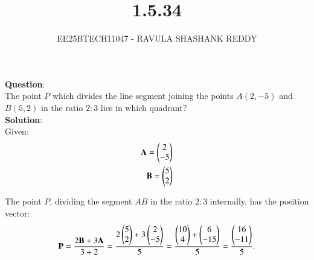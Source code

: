 \documentclass[journal]{article}
\begin{document}
	
	
	\vspace{3cm}
	
\title{1.5.34}
\author{EE25BTECH11047 - RAVULA SHASHANK REDDY}
\maketitle
\hrulefill
\bigskip 

\renewcommand{\thefigure}{\theenumi}
\renewcommand{\thetable}{\theenumi}
\setlength{\intextsep}{10pt}

\textbf{Question}:\\

The point \(P\) which divides the line segment joining the points \(A(2,-5)\) and \(B(5,2)\) in the ratio \(2:3\) lies in which quadrant?\\

\textbf{Solution}:\\

  Given:
\begin{align}
\mathbf{A} = \begin{pmatrix}2 \\ -5\end{pmatrix} \\ \mathbf{B} = \begin{pmatrix}5 \\ 2\end{pmatrix}
\end{align}

The point \(P\), dividing the segment \(AB\) in the ratio \(2:3\) internally, has the position vector:
\begin{align}
\mathbf{P} = \frac{2 \mathbf{B} + 3\mathbf{A}}{3 + 2} = \frac{2 \begin{pmatrix}5 \\ 2\end{pmatrix} + 3\begin{pmatrix}2 \\ -5\end{pmatrix}}{5} = \frac{\begin{pmatrix}10 \\ 4\end{pmatrix} + \begin{pmatrix}6 \\ -15\end{pmatrix}}{5} = \frac{\begin{pmatrix}16 \\ -11\end{pmatrix}}{5}.
\end{align}
\end{document}
